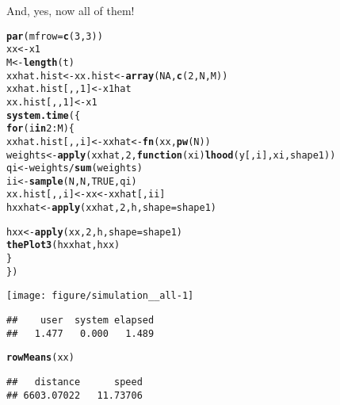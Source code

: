 \documentclass[11pt]{article}\usepackage[]{graphicx}\usepackage[]{color}
\makeatletter
\def\maxwidth{ %
  \ifdim\Gin@nat@width>\linewidth
    \linewidth
  \else
    \Gin@nat@width
  \fi
}
\newcommand{\hlnum}[1]{\textcolor[rgb]{0.686,0.059,0.569}{#1}}%
\newcommand{\hlopt}[1]{\textcolor[rgb]{0,0,0}{#1}}%
\newcommand{\hlstd}[1]{\textcolor[rgb]{0.345,0.345,0.345}{#1}}%
\newcommand{\hlkwa}[1]{\textcolor[rgb]{0.161,0.373,0.58}{\textbf{#1}}}%
\newcommand{\hlkwb}[1]{\textcolor[rgb]{0.69,0.353,0.396}{#1}}%
\newcommand{\hlkwc}[1]{\textcolor[rgb]{0.333,0.667,0.333}{#1}}%
\newcommand{\hlkwd}[1]{\textcolor[rgb]{0.737,0.353,0.396}{\textbf{#1}}}%
\newenvironment{kframe}{%
 \def\at@end@of@kframe{}%
 \ifinner\ifhmode%
  \def\at@end@of@kframe{\end{minipage}}%
  \begin{minipage}{\columnwidth}%
 \fi\fi%
 \def\FrameCommand##1{\hskip\@totalleftmargin \hskip-\fboxsep
 \colorbox{shadecolor}{##1}\hskip-\fboxsep
     \hskip-\linewidth \hskip-\@totalleftmargin \hskip\columnwidth}%
 \MakeFramed {\advance\hsize-\width
   \@totalleftmargin\z@ \linewidth\hsize
   \@setminipage}}%
 {\par\unskip\endMakeFramed%
 \at@end@of@kframe}
\newenvironment{knitrout}{}{} %
\makeatother
\begin{document}
And, yes, now all of them!

\begin{knitrout}
\color{fgcolor}\begin{kframe}
\begin{alltt}
\hlkwd{par}\hlstd{(}\hlkwc{mfrow} \hlstd{=} \hlkwd{c}\hlstd{(}\hlnum{3}\hlstd{,} \hlnum{3}\hlstd{))}
\hlstd{xx} \hlkwb{<-} \hlstd{x1}
\hlstd{M} \hlkwb{<-} \hlkwd{length}\hlstd{(t)}
\hlstd{xxhat.hist} \hlkwb{<-} \hlstd{xx.hist} \hlkwb{<-} \hlkwd{array}\hlstd{(}\hlnum{NA}\hlstd{,} \hlkwd{c}\hlstd{(}\hlnum{2}\hlstd{, N, M))}
\hlstd{xxhat.hist[,,}\hlnum{1}\hlstd{]} \hlkwb{<-} \hlstd{x1hat}
\hlstd{xx.hist[,,}\hlnum{1}\hlstd{]} \hlkwb{<-} \hlstd{x1}
\hlkwd{system.time}\hlstd{(\{}
    \hlkwa{for} \hlstd{(i} \hlkwa{in} \hlnum{2}\hlopt{:}\hlstd{M) \{}
        \hlstd{xxhat.hist[,,i]} \hlkwb{<-} \hlstd{xxhat} \hlkwb{<-} \hlkwd{fn}\hlstd{(xx,} \hlkwd{pw}\hlstd{(N))}
        \hlstd{weights} \hlkwb{<-} \hlkwd{apply}\hlstd{(xxhat,} \hlnum{2}\hlstd{,} \hlkwa{function}\hlstd{(}\hlkwc{xi}\hlstd{)} \hlkwd{lhood}\hlstd{(y[, i], xi, shape1))}
        \hlstd{qi} \hlkwb{<-} \hlstd{weights} \hlopt{/} \hlkwd{sum}\hlstd{(weights)}
        \hlstd{ii} \hlkwb{<-} \hlkwd{sample}\hlstd{(N, N,} \hlnum{TRUE}\hlstd{, qi)}
        \hlstd{xx.hist[,,i]} \hlkwb{<-} \hlstd{xx} \hlkwb{<-} \hlstd{xxhat[, ii]}
        \hlstd{hxxhat} \hlkwb{<-} \hlkwd{apply}\hlstd{(xxhat,} \hlnum{2}\hlstd{, h,} \hlkwc{shape} \hlstd{= shape1)}

        \hlstd{hxx} \hlkwb{<-} \hlkwd{apply}\hlstd{(xx,} \hlnum{2}\hlstd{, h,} \hlkwc{shape} \hlstd{= shape1)}
        \hlkwd{thePlot3}\hlstd{(hxxhat, hxx)}
    \hlstd{\}}
\hlstd{\})}
\end{alltt}
\end{kframe}

{\centering \texttt{[image: figure/simulation\_\_all-1]} 

}


\begin{kframe}\begin{verbatim}
##    user  system elapsed 
##   1.477   0.000   1.489
\end{verbatim}
\begin{alltt}
\hlkwd{rowMeans}\hlstd{(xx)}
\end{alltt}
\begin{verbatim}
##   distance      speed 
## 6603.07022   11.73706
\end{verbatim}
\end{kframe}
\end{knitrout}
\end{document}
